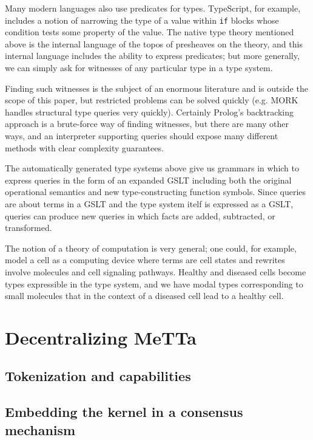 \documentclass{article}
\begin{document}
Many modern languages also use predicates for types.  TypeScript, for example, includes a notion of narrowing the type of a value within \verb+if+ blocks whose condition tests some property of the value.  The native type theory mentioned above is the internal language of the topos of presheaves on the theory, and this internal language includes the ability to express predicates; but more generally, we can simply ask for witnesses of any particular type in a type system.  

Finding such witnesses is the subject of an enormous literature and is outside the scope of this paper, but restricted problems can be solved quickly (e.g. MORK handles structural type queries very quickly).  Certainly Prolog's backtracking approach is a brute-force way of finding witnesses, but there are many other ways, and an interpreter supporting queries should expose many different methods with clear complexity guarantees.

The automatically generated type systems above give us grammars in which to express queries in the form of an expanded GSLT including both the original operational semantics and new type-constructing function symbols. Since queries are about terms in a GSLT and the type system itelf is expressed as a GSLT, queries can produce new queries in which facts are added, subtracted, or transformed.

The notion of a theory of computation is very general; one could, for example, model a cell as a computing device where terms are cell states and rewrites involve molecules and cell signaling pathways.  Healthy and diseased cells become types expressible in the type system, and we have modal types corresponding to small molecules that in the context of a diseased cell lead to a healthy cell.

\section{Decentralizing MeTTa}

\subsection{Tokenization and capabilities}
\label{Security model}

\subsection{Embedding the kernel in a consensus mechanism}
\end{document}
